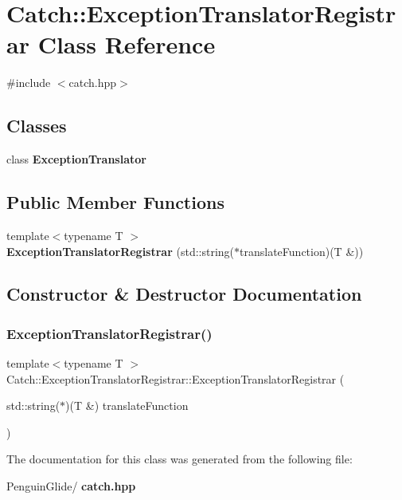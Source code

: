 \section{Catch\+::Exception\+Translator\+Registrar Class Reference}
\label{class_catch_1_1_exception_translator_registrar}


{\ttfamily \#include $<$catch.\+hpp$>$}

\subsection*{Classes}
\begin{DoxyCompactItemize}
\item 
class \textbf{ Exception\+Translator}
\end{DoxyCompactItemize}
\subsection*{Public Member Functions}
\begin{DoxyCompactItemize}
\item 
{\footnotesize template$<$typename T $>$ }\\\textbf{ Exception\+Translator\+Registrar} (std\+::string($\ast$translate\+Function)(T \&))
\end{DoxyCompactItemize}


\subsection{Constructor \& Destructor Documentation}
\mbox{\label{class_catch_1_1_exception_translator_registrar_aa73229de911f26b1df6c6c87c4d9e04e}} 
\subsubsection{ExceptionTranslatorRegistrar()}
{\footnotesize\ttfamily template$<$typename T $>$ \\
Catch\+::\+Exception\+Translator\+Registrar\+::\+Exception\+Translator\+Registrar (\begin{DoxyParamCaption}\item[{std\+::string($\ast$)(T \&)}]{translate\+Function }\end{DoxyParamCaption})\hspace{0.3cm}{\ttfamily [inline]}}



The documentation for this class was generated from the following file\+:\begin{DoxyCompactItemize}
\item 
Penguin\+Glide/\textbf{ catch.\+hpp}\end{DoxyCompactItemize}
